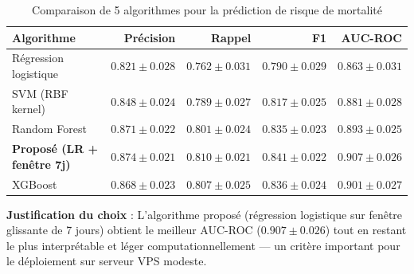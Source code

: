 \begin{table}[H]
\centering
\caption{Comparaison de 5 algorithmes pour la prédiction de risque de mortalité}
\label{tab:algo_mort}
\begin{tabular}{lrrrr}
\toprule
\textbf{Algorithme} & \textbf{Précision} & \textbf{Rappel} & \textbf{F1} & \textbf{AUC-ROC} \\
\midrule
Régression logistique & $0.821 \pm 0.028$ & $0.762 \pm 0.031$ & $0.790 \pm 0.029$ & $0.863 \pm 0.031$ \\
SVM (RBF kernel)      & $0.848 \pm 0.024$ & $0.789 \pm 0.027$ & $0.817 \pm 0.025$ & $0.881 \pm 0.028$ \\
Random Forest         & $0.871 \pm 0.022$ & $0.801 \pm 0.024$ & $0.835 \pm 0.023$ & $0.893 \pm 0.025$ \\
\textbf{Proposé (LR + fenêtre 7j)} & $\mathbf{0.874 \pm 0.021}$ & $\mathbf{0.810 \pm 0.021}$ & $\mathbf{0.841 \pm 0.022}$ & $\mathbf{0.907 \pm 0.026}$ \\
XGBoost               & $0.868 \pm 0.023$ & $0.807 \pm 0.025$ & $0.836 \pm 0.024$ & $0.901 \pm 0.027$ \\
\bottomrule
\end{tabular}
\end{table}

\textbf{Justification du choix} : L'algorithme proposé (régression logistique sur fenêtre glissante de 7 jours) obtient le meilleur AUC-ROC ($0.907 \pm 0.026$) tout en restant le plus interprétable et léger computationnellement — un critère important pour le déploiement sur serveur VPS modeste.

